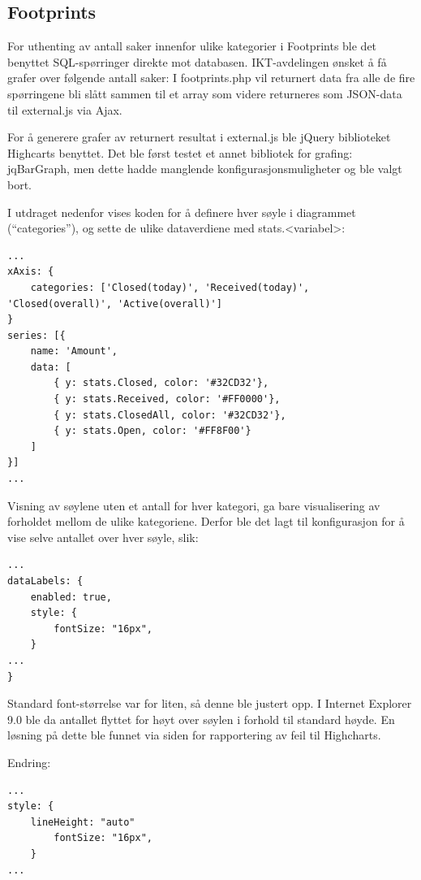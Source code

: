\subsection{Footprints}
For uthenting av antall saker innenfor ulike kategorier i Footprints ble det benyttet SQL-spørringer direkte mot databasen. IKT-avdelingen ønsket å få grafer over følgende antall saker:
I footprints.php vil returnert data fra alle de fire spørringene bli slått sammen til et array som videre returneres som JSON-data til external.js via Ajax. 

For å generere grafer av returnert resultat i external.js ble jQuery biblioteket Highcarts benyttet. Det ble først testet et annet bibliotek for grafing: jqBarGraph, men dette hadde manglende konfigurasjonsmuligheter og ble valgt bort. 

I utdraget nedenfor vises koden for å definere hver søyle i diagrammet (``categories''), og sette de ulike dataverdiene med stats.<variabel>:
\begin{lstlisting}[style=example]
...
xAxis: {
    categories: ['Closed(today)', 'Received(today)', 'Closed(overall)', 'Active(overall)']
}
series: [{
    name: 'Amount',
    data: [
        { y: stats.Closed, color: '#32CD32'},
        { y: stats.Received, color: '#FF0000'},
        { y: stats.ClosedAll, color: '#32CD32'},
        { y: stats.Open, color: '#FF8F00'}
    ]
}]
...
\end{lstlisting}

Visning av søylene uten et antall for hver kategori, ga bare visualisering av forholdet mellom de ulike kategoriene. Derfor ble det lagt til konfigurasjon for å vise selve antallet over hver søyle, slik: 
\begin{lstlisting}
...
dataLabels: {
    enabled: true,
    style: {
        fontSize: "16px",
    }
...
}
\end{lstlisting}
Standard font-størrelse var for liten, så denne ble justert opp. I Internet Explorer 9.0 ble da antallet flyttet for høyt over søylen i forhold til standard høyde. En løsning på dette ble funnet via siden for rapportering av feil til Highcharts\cite{iebug}. 

Endring:
\begin{lstlisting}[style=example]
...
style: {
	lineHeight: "auto"
        fontSize: "16px",
    }
...
\end{lstlisting}

